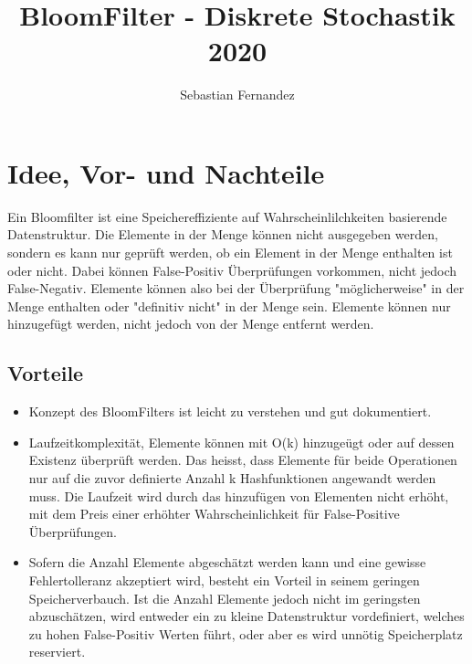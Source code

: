 \documentclass[11pt]{article} %
\begin{document}
\title{\vspace{-2cm}BloomFilter - Diskrete Stochastik 2020}
\author{Sebastian Fernandez}
\date{}
\maketitle

\section{Idee, Vor- und Nachteile}
Ein Bloomfilter ist eine Speichereffiziente auf Wahrscheinlilchkeiten basierende Datenstruktur. Die Elemente in der Menge können nicht ausgegeben werden, sondern es kann nur geprüft werden, ob ein Element in der Menge enthalten ist oder nicht. Dabei können False-Positiv Überprüfungen vorkommen, nicht jedoch False-Negativ. Elemente können also bei der Überprüfung "möglicherweise" in der Menge enthalten oder "definitiv nicht" in der Menge sein. Elemente können nur hinzugefügt werden, nicht jedoch von der Menge entfernt werden.
	\subsection {Vorteile}
		\begin{itemize}
    			\item Konzept des BloomFilters ist leicht zu verstehen und gut dokumentiert.
 			\item Laufzeitkomplexität, Elemente können mit O(k) hinzugeügt oder auf dessen Existenz überprüft werden. Das heisst, dass Elemente für beide Operationen nur auf die zuvor definierte Anzahl k Hashfunktionen angewandt werden muss. Die Laufzeit wird durch das hinzufügen von Elementen nicht erhöht, mit dem Preis einer erhöhter Wahrscheinlichkeit für False-Positive Überprüfungen.
 			\item Sofern die Anzahl Elemente abgeschätzt werden kann und eine gewisse Fehlertolleranz akzeptiert wird, besteht ein Vorteil in seinem geringen Speicherverbauch. Ist die Anzahl Elemente jedoch nicht im geringsten abzuschätzen, wird entweder ein zu kleine Datenstruktur vordefiniert, welches zu hohen False-Positiv Werten führt, oder aber es wird unnötig Speicherplatz reserviert.
		\end{itemize}
\end{document}
